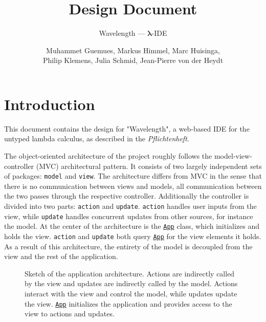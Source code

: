 \documentclass[a4paper, parskip=half]{scrartcl}
\title{Design Document}
\subtitle{Wavelength --- $\bm{\lambda}$-IDE}
\author{Muhammet Guemues, Markus Himmel, Marc Huisinga,\\Philip Klemens, Julia Schmid, Jean-Pierre von der Heydt}
\begin{document}
\maketitle
\thispagestyle{empty}
\newpage
\tableofcontents
\newpage
\section{Introduction}

This document contains the design for "Wavelength", a web-based IDE for the untyped
lambda calculus, as described in the \textit{Pflichtenheft}.

The object-oriented architecture of the project roughly follows the model-view-controller (MVC)
architectural pattern. It consists of two largely independent sets of packages: \texttt{model} and \texttt{view}.
The architecture differs from MVC in the sense that there is no communication between views and models, 
all communication between the two passes through the respective controller. 
Additionally the controller is divided into two parts: \texttt{action} and \texttt{update}. 
\texttt{action} handles user inputs from the view, while \texttt{update} handles concurrent updates from other sources, for instance the model.
At the center of the architecture is the \texttt{\hyperref[type:edu.kit.wavelength.client.view.App]{App}} class, which initializes and holds the view. 
\texttt{action} and \texttt{update} both query \texttt{\hyperref[type:edu.kit.wavelength.client.view.App]{App}} for the view elements it holds.
As a result of this architecture, the entirety of the model is decoupled from the view and the rest of the application.

\begin{figure}[h]
	\centering
	\caption{Sketch of the application architecture. Actions are indirectly called by the view
	and updates are indirectly called by the model. Actions interact with the view and control the model,
	while updates update the view. \texttt{\hyperref[type:edu.kit.wavelength.client.view.App]{App}} initializes 
	the application and provides access to the view to
		actions and updates.}
\end{figure}
\end{document}
